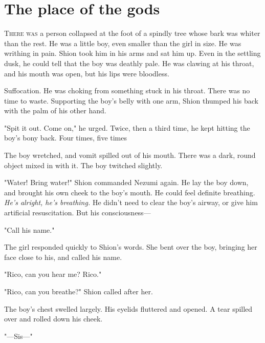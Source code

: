 
\chapter{The place of the gods}


\lettrine{T}{here was} a person collapsed at the foot of a spindly tree whose bark
was whiter than the rest. He was a little boy, even smaller than the
girl in size. He was writhing in pain. Shion took him in his arms and
sat him up. Even in the settling dusk, he could tell that the boy was
deathly pale. He was clawing at his throat, and his mouth was open, but
his lips were bloodless.

\myspace

Suffocation. He was choking from something stuck in his throat. There
was no time to waste. Supporting the boy's belly with one arm, Shion
thumped his back with the palm of his other hand.

"Spit it out. Come on," he urged. Twice, then a third time, he kept
hitting the boy's bony back. Four times, five times\el 

The boy wretched, and vomit spilled out of his mouth. There was a dark,
round object mixed in with it. The boy twitched slightly.

"Water! Bring water!" Shion commanded Nezumi again. He lay the boy down,
and brought his own cheek to the boy's mouth. He could feel definite
breathing. \emph{He's alright, he's breathing.} He didn't need to clear the
boy's airway, or give him artificial resuscitation. But his
consciousness---

"Call his name."

The girl responded quickly to Shion's words. She bent over the boy,
bringing her face close to his, and called his name.

"Rico, can you hear me? Rico."

"Rico, can you breathe?" Shion called after her.

The boy's chest swelled largely. His eyelids fluttered and opened. A
tear spilled over and rolled down his cheek.

"---Sis---"

